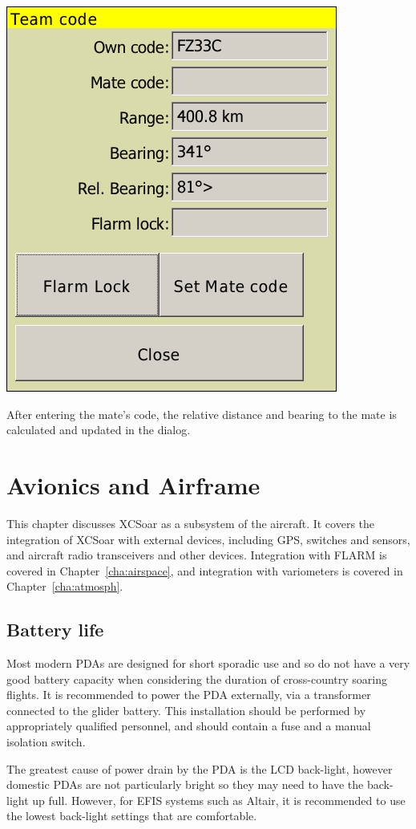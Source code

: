 \documentclass[a4paper,12pt]{refrep}
\begin{document}
\begin{center}
\includegraphics[angle=0,width=0.5\linewidth,keepaspectratio='true']{figures/fig-teamcode1.png}
\end{center}

  After entering the mate's code, the relative distance and
  bearing to the mate is calculated and updated in the dialog.



\chapter{Avionics and Airframe}\label{cha:avionics-airframe}

This chapter discusses XCSoar as a subsystem of the aircraft.  It
covers the integration of XCSoar with external devices, including GPS,
switches and sensors, and aircraft radio transceivers and other
devices.  Integration with FLARM is covered in
Chapter~\ref{cha:airspace}, and integration with variometers is
covered in Chapter~\ref{cha:atmosph}.

\section{Battery life}

Most modern PDAs are designed for short sporadic use and so do not
have a very good battery capacity when considering the duration of
cross-country soaring flights.  It is recommended to power the PDA
externally, via a transformer connected to the glider battery.  This
installation should be performed by appropriately qualified personnel,
and should contain a fuse and a manual isolation switch.

The greatest cause of power drain by the PDA is the LCD back-light,
however domestic PDAs are not particularly bright so they may need to
have the back-light up full. However, for EFIS systems such as Altair,
it is recommended to use the lowest back-light settings that are
comfortable.
\end{document}
